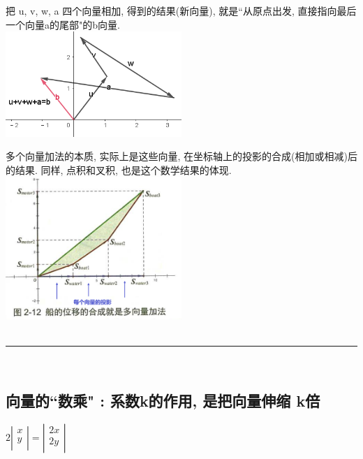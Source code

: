\documentclass[UTF8]{ctexart}
\begin{document}
\begin{myEnvSample}
把 u, v, w, a 四个向量相加, 得到的结果(新向量), 就是``从原点出发, 直接指向最后一个向量a的尾部"的b向量.	\\
\includegraphics[width=0.5\textwidth]{img/0124.png}
\end{myEnvSample}

多个向量加法的本质, 实际上是这些向量, 在坐标轴上的投影的合成(相加或相减)后的结果. 同样, 点积和叉积, 也是这个数学结果的体现. \\
\includegraphics[width=0.5\textwidth]{img/0125.png}\\





~\\
\hrule
~\\

\subsection{向量的``数乘" : 系数k的作用, 是把向量伸缩 k倍}

$2\left| \begin{array}{l}
		x \\
		y \\
	\end{array} \right|=\left| \begin{array}{l}
		2x \\
		2y \\
	\end{array} \right|
$\\
\end{document}
